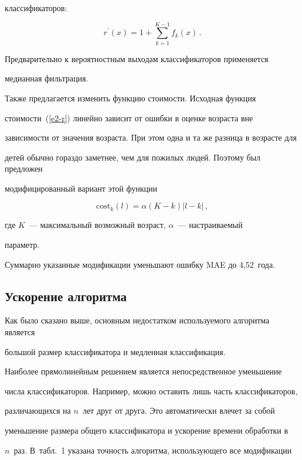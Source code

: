 классификаторов:

$$

r^\prime(x) =1+\sum\limits_{k=1}^{K-1} f_k(x)\,.

$$



Предварительно к вероятностным выходам классификаторов применяется

медианная фильтрация.



Также предлагается изменить функцию стоимости. Исходная функция

стоимости~(\ref{e2-r}) линейно зависит от ошибки в оценке возраста вне

зависимости от значения возраста. При этом одна и та же разница в возрасте для

детей обычно гораздо заметнее, чем для пожилых людей. Поэтому был предложен

модифицированный вариант этой функции

$$

\mathrm{cost}_k(l)=\alpha (K-k) \vert l-k\vert\,,

$$

где $K$~--- максимальный возможный возраст, $\alpha$~--- настраиваемый

параметр.



Суммарно указанные модификации уменьшают ошибку MAE до 4,52~года.



\subsection{Ускорение алгоритма}



Как было сказано выше, основным недостатком используемого алгоритма является

большой размер классификатора и медленная классификация.



Наиболее прямолинейным решением является непосредственное уменьшение

числа классификаторов. Например, можно оставить лишь часть классификаторов,

различающихся на $n$~лет друг от друга. Это автоматически влечет за собой

уменьшение размера общего классификатора и ускорение времени обработки в

$n$~раз. В~табл.~1 указана точность алгоритма, использующего все модификации

